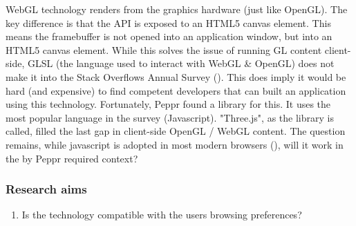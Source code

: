 \cite{webGL}

WebGL technology renders from the graphics hardware (just like OpenGL). The key difference is that the API is exposed to an HTML5 canvas element. This means the framebuffer is not opened into an application window, but into an HTML5 canvas element. While this solves the issue of running GL content client-side, GLSL (the language used to interact with WebGL \& OpenGL) does not make it into the Stack Overflows Annual Survey (\cite{stackoverflowDeveloperSurvey}). This does imply it would be hard (and expensive) to find competent developers that can built an application using this technology.
Fortunately, Peppr found a library for this. It uses the most popular language in the survey (Javascript). "Three.js", as the library is called, filled the last gap in client-side OpenGL / WebGL content. The question remains, while javascript is adopted in most modern browsers (\cite{javascriptSupport}), will it work in the by Peppr required context?

\subsubsection{Research aims}
\begin{enumerate}
	\item {Is the technology compatible with the users browsing preferences?}
\end{enumerate}


\newpage





